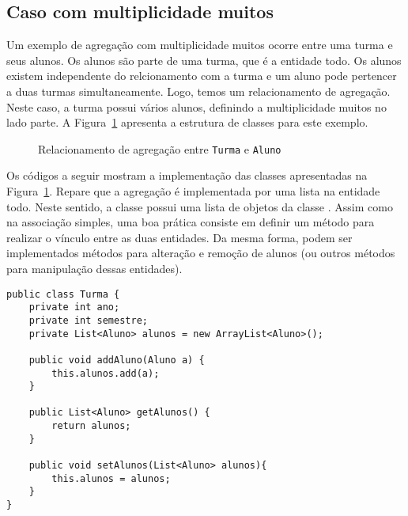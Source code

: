 \subsection{Caso com multiplicidade muitos}

Um exemplo de agregação com multiplicidade muitos ocorre entre uma turma e seus alunos. Os alunos são parte de uma turma, que é a entidade todo. Os alunos existem independente do relcionamento com a turma e um aluno pode pertencer a duas turmas simultaneamente. Logo, temos um relacionamento de agregação. Neste caso, a turma possui vários alunos, definindo a multiplicidade muitos no lado parte. A Figura~\ref{fig:agregacao-turma-aluno} apresenta a estrutura de classes para este exemplo.

\begin{figure}[h]
	\centering
	
	
	\caption{Relacionamento de agregação entre \texttt{Turma} e \texttt{Aluno}}
	\label{fig:agregacao-turma-aluno}
\end{figure}
 
Os códigos a seguir mostram a implementação das classes apresentadas na Figura~\ref{fig:agregacao-turma-aluno}. Repare que a agregação é implementada por uma lista na entidade todo. Neste sentido, a classe  possui uma lista de objetos da classe . Assim como na associação simples, uma boa prática consiste em definir um método  para realizar o vínculo entre as duas entidades. Da mesma forma, podem ser implementados métodos para alteração e remoção de alunos (ou outros métodos para manipulação dessas entidades).

\begin{verbatim}
public class Turma {
	private int ano;
	private int semestre;
	private List<Aluno> alunos = new ArrayList<Aluno>();
	
	public void addAluno(Aluno a) {
		this.alunos.add(a);
	}
	
	public List<Aluno> getAlunos() {
		return alunos;
	}
	
	public void setAlunos(List<Aluno> alunos){
		this.alunos = alunos;
	}
}
\end{verbatim}
 
